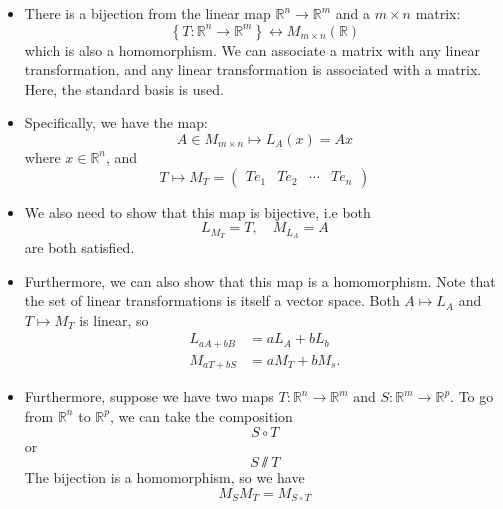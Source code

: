 \begin{itemize}
    \item There is a bijection from the linear map $\mathbb{R}^n \to \mathbb{R}^m$ and a $m\times n$ matrix:
          \begin{equation}
              \left\{T:\mathbb{R}^n \to \mathbb{R}^m\right\} \longleftrightarrow M_{m\times n}(\mathbb{R})
          \end{equation}
          which is also a homomorphism. We can associate a matrix with any linear transformation, and any linear transformation is associated with a matrix. Here, the standard basis is used.
    \item Specifically, we have the map:
          \begin{equation}
              A \in M_{m\times n} \mapsto     L_A(x)= Ax
          \end{equation}
          where $x\in \mathbb{R}^n$, and
          \begin{equation}
              T \mapsto M_T = \begin{pmatrix}
                  Te_1 & Te_2 & \cdots & Te_n
              \end{pmatrix}
          \end{equation}
    \item We also need to show that this map is bijective, i.e both
          \begin{equation}
              L_{M_T}=T,\quad M_{L_A}=A
          \end{equation}
          are both satisfied.
    \item Furthermore, we can also show that this map is a homomorphism. Note that the set of linear transformations is itself a vector space. Both $A\mapsto L_A$ and $T\mapsto M_T$ is linear, so
          \begin{align}
              L_{aA+bB} & = aL_A + bL_b \\
              M_{aT+bS} & = aM_T+bM_s.
          \end{align}
    \item Furthermore, suppose we have two maps $T:\mathbb{R}^n \rightarrow \mathbb{R}^m$ and $S:\mathbb{R}^m \rightarrow \mathbb{R}^p$. To go from $\mathbb{R}^n$ to $\mathbb{R}^p$, we can take the composition
          \begin{equation}
              S \circ T
          \end{equation}
          or
          \begin{equation}
              S \sslash T
          \end{equation}
          The bijection is a homomorphism, so we have
          \begin{equation}
              M_S M_T = M_{S \circ T}
          \end{equation}
\end{itemize}